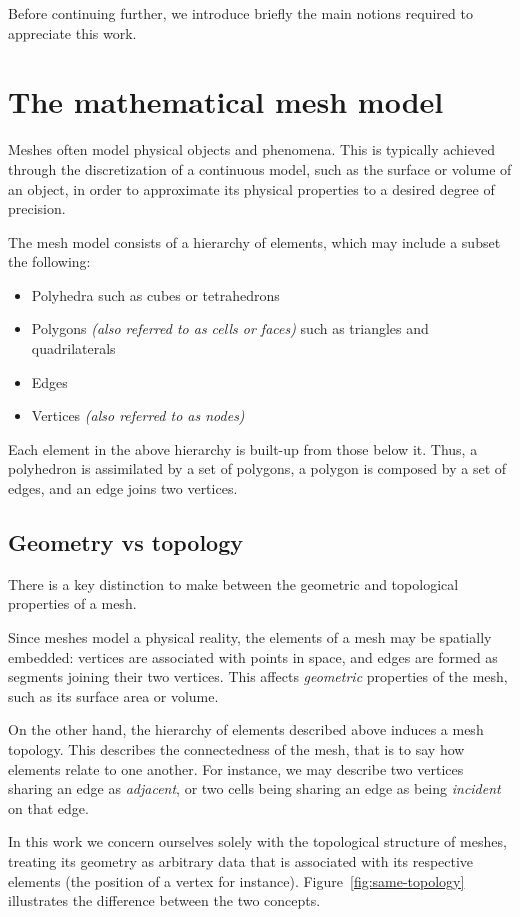 \label{chap:background}
Before continuing further, we introduce briefly the main notions required to appreciate this work.

\section{The mathematical mesh model}

Meshes often model physical objects and phenomena. This is typically achieved through the discretization of a continuous model, such as the surface or volume of an object, in order to approximate its physical properties to a desired degree of precision.
\par

The mesh model consists of a hierarchy of elements, which may include a subset the following:
\begin{itemize}
\item Polyhedra such as cubes or tetrahedrons
\item Polygons \emph{(also referred to as cells or faces)} such as triangles and quadrilaterals
\item Edges
\item Vertices \emph{(also referred to as nodes)}
\end{itemize}



Each element in the above hierarchy is built-up from those below it. Thus, a polyhedron is assimilated by a set of polygons, a polygon is composed by a set of edges, and an edge joins two vertices.


\subsection{Geometry vs topology}
There is a key distinction to make between the geometric and topological properties of a mesh.

Since meshes model a physical reality, the elements of a mesh may be spatially embedded: vertices are associated with points in space, and edges are formed as segments joining their two vertices. This affects \emph{geometric} properties of the mesh, such as its surface area or volume.

On the other hand, the hierarchy of elements described above induces a mesh topology. This describes the connectedness of the mesh, that is to say how elements relate to one another. For instance, we may describe two vertices sharing an edge as \emph{adjacent}, or two cells being sharing an edge as being \emph{incident} on that edge.
\par
In this work we concern ourselves solely with the topological structure of meshes, treating its geometry as arbitrary data that is associated with its respective elements (the position of a vertex for instance). Figure~\ref{fig:same-topology} illustrates the difference between the two concepts.


